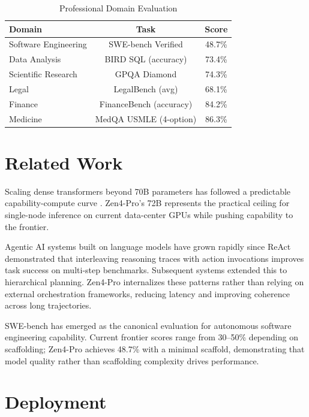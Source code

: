 \documentclass[11pt,a4paper]{article}
\begin{document}
\begin{table}[H]
\centering
\begin{tabular}{lcc}
\toprule
\textbf{Domain} & \textbf{Task} & \textbf{Score} \\
\midrule
Software Engineering & SWE-bench Verified       & 48.7\% \\
Data Analysis        & BIRD SQL (accuracy)      & 73.4\% \\
Scientific Research  & GPQA Diamond             & 74.3\% \\
Legal               & LegalBench (avg)          & 68.1\% \\
Finance             & FinanceBench (accuracy)   & 84.2\% \\
Medicine            & MedQA USMLE (4-option)    & 86.3\% \\
\bottomrule
\end{tabular}
\caption{Professional Domain Evaluation}
\end{table}

\section{Related Work}

Scaling dense transformers beyond 70B parameters has followed a predictable capability-compute
curve \cite{hoffmann2022chinchilla}. Zen4-Pro's 72B represents the practical ceiling for
single-node inference on current data-center GPUs while pushing capability to the frontier.

Agentic AI systems built on language models have grown rapidly since ReAct \cite{yao2023react}
demonstrated that interleaving reasoning traces with action invocations improves task success
on multi-step benchmarks. Subsequent systems \cite{wang2024executable} extended this to
hierarchical planning. Zen4-Pro internalizes these patterns rather than relying on external
orchestration frameworks, reducing latency and improving coherence across long trajectories.

SWE-bench \cite{jimenez2024swebench} has emerged as the canonical evaluation for autonomous
software engineering capability. Current frontier scores range from 30--50\% depending on
scaffolding; Zen4-Pro achieves 48.7\% with a minimal scaffold, demonstrating that model
quality rather than scaffolding complexity drives performance.

\section{Deployment}
\end{document}
